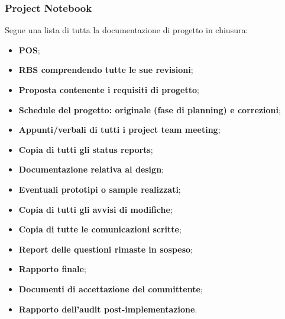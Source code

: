 \subsubsection{Project Notebook}
Segue una lista di tutta la documentazione di progetto in chiusura:
\begin{itemize}
	\item \textbf{POS};
	\item \textbf{RBS comprendendo tutte le sue revisioni};
	\item \textbf{Proposta contenente i requisiti di progetto};
	\item \textbf{Schedule del progetto: originale (fase di planning) e correzioni};
	\item \textbf{Appunti/verbali di tutti i project team meeting};
	\item \textbf{Copia di tutti gli status reports};
	\item \textbf{Documentazione relativa al design};
	\item \textbf{Eventuali prototipi o sample realizzati};
	\item \textbf{Copia di tutti gli avvisi di modifiche};
	\item \textbf{Copia di tutte le comunicazioni scritte};
	\item \textbf{Report delle questioni rimaste in sospeso};
	\item \textbf{Rapporto finale};
	\item \textbf{Documenti di accettazione del committente};
	\item \textbf{Rapporto dell’audit post-implementazione}.
\end{itemize}
